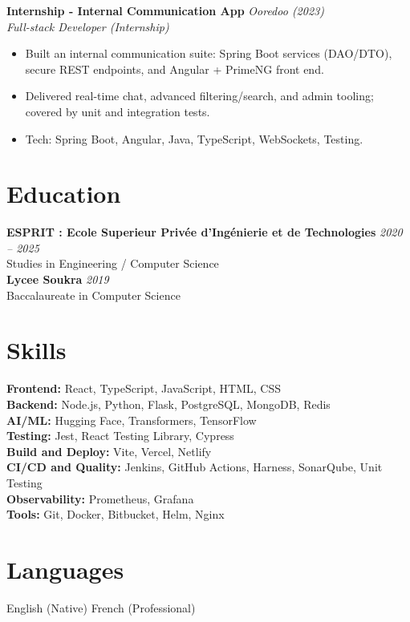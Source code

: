 \documentclass[11pt,a4paper]{article}
\begin{document}
\textbf{Internship - Internal Communication App} \hfill \textit{Ooredoo (2023)}\\
\textit{Full-stack Developer (Internship)}
\begin{itemize}[leftmargin=12pt,itemsep=2pt]
  \item Built an internal communication suite: Spring Boot services (DAO/DTO), secure REST endpoints, and Angular + PrimeNG front end.
  \item Delivered real-time chat, advanced filtering/search, and admin tooling; covered by unit and integration tests.
  \item Tech: Spring Boot, Angular, Java, TypeScript, WebSockets, Testing.
\end{itemize}

\section*{Education}
\textbf{ESPRIT : Ecole Superieur Privée d'Ingénierie et de Technologies} \hfill \textit{2020 -- 2025}\\
Studies in Engineering / Computer Science\\
\vspace{4pt}
\textbf{Lycee Soukra} \hfill \textit{2019}\\
Baccalaureate in Computer Science

\section*{Skills}
\textbf{Frontend:} React, TypeScript, JavaScript, HTML, CSS\\
\textbf{Backend:} Node.js, Python, Flask, PostgreSQL, MongoDB, Redis\\
\textbf{AI/ML:} Hugging Face, Transformers, TensorFlow\\
\textbf{Testing:} Jest, React Testing Library, Cypress\\
\textbf{Build and Deploy:} Vite, Vercel, Netlify\\
\textbf{CI/CD and Quality:} Jenkins, GitHub Actions, Harness, SonarQube, Unit Testing\\
\textbf{Observability:} Prometheus, Grafana\\
\textbf{Tools:} Git, Docker, Bitbucket, Helm, Nginx

\section*{Languages}
English (Native) \textbar{} French (Professional)
\end{document}
